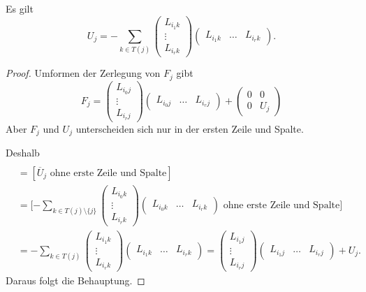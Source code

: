 \begin{satz}
Es gilt \begin{equation*}
	U_j=-\sum_{k \in T(j)} \begin{pmatrix}
		L_{i_1k} \\
		\vdots \\
		L_{i_rk}
	\end{pmatrix}
	\begin{pmatrix}
		L_{i_1k} & \ldots & L_{i_rk}
	\end{pmatrix}.
\end{equation*}
\end{satz}
\begin{proof}
Umformen der Zerlegung von $F_j$ gibt
\begin{equation*}
 F_j=\begin{pmatrix}
		L_{i_0j} \\
		\vdots \\
		L_{i_rj}
	\end{pmatrix} \begin{pmatrix}
		L_{i_0j} & \ldots & L_{i_rj}
	\end{pmatrix}+\begin{pmatrix}
		0 & 0 \\
		0 & U_j
	\end{pmatrix}
\end{equation*}
Aber $F_j$ und $U_j$ unterscheiden sich nur in der ersten Zeile und Spalte.

Deshalb
\begin{align*}
 [ & \text{$F_j$ ohne erste Zeile und Spalte}]  \\
 & =
 [ \text{$\overline{U}_j$ ohne erste Zeile und Spalte}] \\
 & =
 \bigg[ \text{$\displaystyle  -\sum_{k \in T(j) \setminus \lbrace j \rbrace}
 \begin{pmatrix}
		L_{i_0 k} \\
		\vdots \\
		L_{i_r k}
	\end{pmatrix} \begin{pmatrix}
		L_{i_0 k} & \dots & L_{i_r k}
 \end{pmatrix}$ ohne erste Zeile und Spalte}\bigg] \\
 & =
 -\sum_{k \in T(j)} \begin{pmatrix}
		L_{i_1k} \\
		\vdots \\
		L_{i_rk}
	\end{pmatrix} \begin{pmatrix}
		L_{i_1k} & \ldots & L_{i_rk}
	\end{pmatrix}=\begin{pmatrix}
		L_{i_1j} \\
		\vdots \\
		L_{i_rj}
	\end{pmatrix} \begin{pmatrix}
		L_{i_1j} & \ldots & L_{i_rj}
	\end{pmatrix}+U_j.
\end{align*}
Daraus folgt die Behauptung.
\end{proof}

